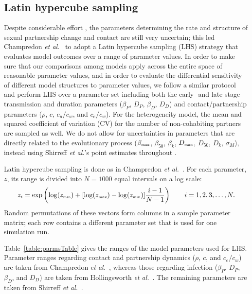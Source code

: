 \documentclass[10pt,letterpaper]{article}
\newcommand{\etal}{\textit{et al.}}
\newcommand{\tsub}[2]{#1_{{\textrm{\tiny #2}}}}
\begin{document}
\subsection*{Latin hypercube sampling}

Despite considerable effort \cite{hollingsworth_hiv1_2008,champredon_hiv_2013}, the parameters determining the rate and structure of sexual partnership change and contact are still very uncertain; this led Champredon \etal\ \cite{champredon_hiv_2013} to adopt a Latin hypercube sampling (LHS) strategy \cite{blower_drugs_1991} that evaluates model outcomes over a range of parameter values. In order to make sure that our comparisons among models apply across the entire space of reasonable parameter values, and in order to evaluate the differential sensitivity of different model structures to parameter values, we follow a similar protocol and perform LHS over a parameter set including both the early- and late-stage transmission and duration parameters ($\beta_P$, $D_P$, $\beta_D$, $D_D$) and contact/partnership parameters ($\rho$, $c$, $c_u/c_w$, and $c_e/c_w$). For the heterogeneity model, the mean and squared coefficient of variation (CV) for the number of non-cohabiting partners are sampled as well. We do not allow for uncertainties in parameters that are directly related to the evolutionary process ($\tsub{\beta}{max}$, $\beta_{50}$, $\beta_k$, $\tsub{D}{max}$, $D_{50}$, $D_k$, $\sigma_M$), instead using Shirreff \etal's point estimates throughout \cite{shirreff_transmission_2011}.

Latin hypercube sampling is done as in Champredon \etal\ \cite{champredon_hiv_2013}. For each parameter, $z$, its range is divided into $N = 1000$ equal intervals on a log scale:
\begin{equation}
z_i = \exp\left(\log(\tsub{z}{min}) + [\log(\tsub{z}{max}) - \log(\tsub{z}{min})] \frac{i-1}{N-1}\right) \qquad i = 1, 2, 3, \dots,N.
\end{equation}
Random permutations of these vectors form columns in a sample parameter matrix; each row contains a different parameter set that is used for one simulation run.

Table~\ref{table:parmsTable} gives the ranges of the model parameters used for LHS. Parameter ranges regarding contact and partnership dynamics ($\rho$, $c$, and $c_e/c_w$) are taken from Champredon \etal\ \cite{champredon_hiv_2013}, whereas those regarding infection ($\beta_P$, $D_P$, $\beta_D$, and $D_D$) are taken from Hollingsworth \etal\ \cite{hollingsworth_hiv1_2008}. The remaining parameters are taken from Shirreff \etal\ \cite{shirreff_transmission_2011}.
\end{document}
